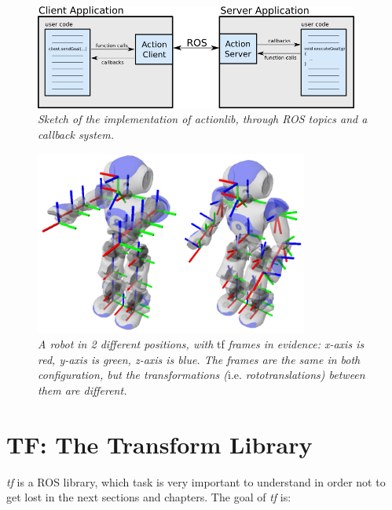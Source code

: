 \begin{figure}
	\centering
	\includegraphics[width=0.95\textwidth]{Images/background_and_tools/actionlib.png}
	\caption{\textit{Sketch of the implementation of actionlib, through \ac{ROS} topics and a callback system.}}
	\label{fig:actionlib}
\end{figure}

\begin{figure}
	\centering
	\includegraphics[width=0.8\textwidth]{Images/background_and_tools/tf_tree.png}
	\caption{\textit{A robot in 2 different positions, with} tf \textit{frames in evidence: x-axis is red, y-axis is green, z-axis is blue. The frames are the same in both configuration, but the transformations (}i.e. \textit{rototranslations) between them are different.}}
	\label{fig:tfTreeRviz}
\end{figure}


\section{TF: The Transform Library}\label{sec:tf}
\textit{tf} is a \ac{ROS} library, which task is very important to understand in order not to get lost in the next sections and chapters.  The goal of \textit{tf} is:

